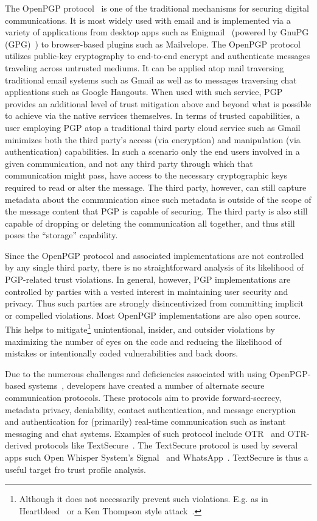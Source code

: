 The OpenPGP protocol~\cite{callas2007} is one of the traditional
mechanisms for securing digital communications. It is most widely used
with email and is implemented via a variety of applications from
desktop apps such as Enigmail~\cite{enigmail} (powered by GnuPG
(GPG)~\cite{gnupg}) to browser-based plugins such as
Mailvelope\cite{mailvelope}. The OpenPGP protocol utilizes public-key
cryptography to end-to-end encrypt and authenticate messages traveling
across untrusted mediums. It can be applied atop mail traversing
traditional email systems such as Gmail as well as to messages
traversing chat applications such as Google Hangouts. When used with
such service, PGP provides an additional level of trust mitigation
above and beyond what is possible to achieve via the native services
themselves. In terms of trusted capabilities, a user employing PGP
atop a traditional third party cloud service such as Gmail minimizes
both the third party's access (via encryption) and manipulation (via
authentication) capabilities. In such a scenario only the end users
involved in a given communication, and not any third party through
which that communication might pass, have access to the necessary
cryptographic keys required to read or alter the message. The third
party, however, can still capture metadata about the communication
since such metadata is outside of the scope of the message content
that PGP is capable of securing. The third party is also still capable
of dropping or deleting the communication all together, and thus still
poses the ``storage'' capability.

Since the OpenPGP protocol and associated implementations are not
controlled by any single third party, there is no straightforward
analysis of its likelihood of PGP-related trust violations. In
general, however, PGP implementations are controlled by parties with a
vested interest in maintaining user security and privacy. Thus such
parties are strongly disincentivized from committing implicit or
compelled violations. Most OpenPGP implementations are also open
source. This helps to mitigate\footnote{Although it does not
  necessarily prevent such violations.  E.g. as in
  Heartbleed~\cite{heartbleed} or a Ken Thompson style
  attack~\cite{thompson1984}.} unintentional, insider, and outsider
violations by maximizing the number of eyes on the code and reducing
the likelihood of mistakes or intentionally coded vulnerabilities and
back doors.

Due to the numerous challenges and deficiencies associated with using
OpenPGP-based systems~\cite{green-pgp}, developers have created a
number of alternate secure communication protocols. These protocols
aim to provide forward-secrecy, metadata privacy, deniability, contact
authentication, and message encryption and authentication for
(primarily) real-time communication such as instant messaging and chat
systems. Examples of such protocol include OTR~\cite{otr-v3} and
OTR-derived protocols like TextSecure~\cite{otr-advanced-ratchet}. The
TextSecure protocol is used by several apps such Open Whisper System's
Signal~\cite{openwhisper} and WhatsApp~\cite{whatsapp}. TextSecure is
thus a useful target fro trust profile analysis.

